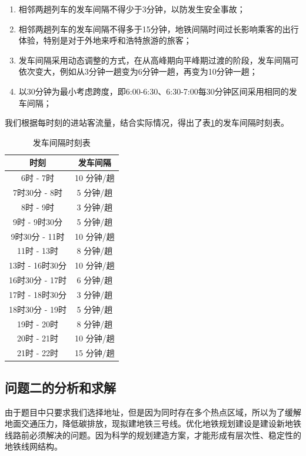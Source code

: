 \documentclass[12pt,a4paper]{mcmthesis}
\begin{document}
    \begin{enumerate}
        \item 相邻两趟列车的发车间隔不得少于3分钟，以防发生安全事故；
        \item 相邻两趟列车的发车间隔不得多于15分钟，地铁间隔时间过长影响乘客的出行体验，特别是对于外地来呼和浩特旅游的旅客；
        \item 发车间隔采用动态调整的方式，在从高峰期向平峰期过渡的阶段，发车间隔可依次变大，例如从3分钟一趟变为6分钟一趟，再变为10分钟一趟；
        \item 以30分钟为最小考虑跨度，即6:00-6:30、6:30-7:00每30分钟区间采用相同的发车间隔；
    \end{enumerate}

    我们根据每时刻的进站客流量，结合实际情况，得出了表\ref{tab:p1_interval}的发车间隔时刻表。

    \begin{table}[h]
        \centering
        \caption{发车间隔时刻表}
        \label{tab:p1_interval}
        \begin{tabular}{c|c}
            \hline
            时刻           & 发车间隔    \\ \hline
            6时 - 7时      & 10 分钟/趟 \\
            7时30分 - 8时   & 5 分钟/趟  \\
            8时 - 9时      & 3 分钟/趟  \\
            9时 - 9时30分   & 5 分钟/趟  \\
            9时30分 - 11时  & 10 分钟/趟 \\
            11时 - 13时    & 8 分钟/趟  \\
            13时 - 16时30分 & 10 分钟/趟 \\
            16时30分 - 17时 & 6 分钟/趟  \\
            17时 - 18时30分 & 3 分钟/趟  \\
            18时30分 - 19时 & 5 分钟/趟  \\
            19时 - 20时    & 8 分钟/趟  \\
            20时 - 21时    & 10 分钟/趟 \\
            21时 - 22时    & 15 分钟/趟 \\ \hline
        \end{tabular}
    \end{table}

    \subsection{问题二的分析和求解}
    由于题目中只要求我们选择地址，但是因为同时存在多个热点区域，所以为了缓解地面交通压力，降低碳排放，现拟建地铁三号线。优化地铁规划建设是建设新地铁线路前必须解决的问题。因为科学的规划建造方案，才能形成有层次性、稳定性的地铁线网结构。
\end{document}
